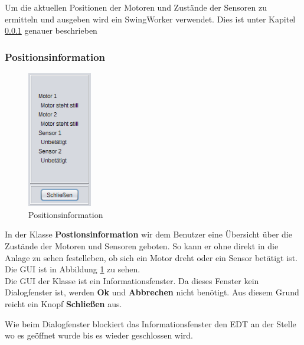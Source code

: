 \vspace{10pt}

Um die aktuellen Positionen der Motoren und Zustände der Sensoren zu ermitteln und ausgeben wird ein SwingWorker verwendet. Dies ist unter Kapitel \ref{subsubsec:Positionsinformation} genauer beschrieben

\newpage

\subsubsection{Positionsinformation} \label{subsubsec:Positionsinformation}
\begin{figure}
\vspace{-20pt}
  \begin{center}
    \includegraphics[width=0.25\textwidth]{Bilder/GUI/Positionsinformation}
  \end{center}
  \caption{Positionsinformation}
  \label{Positionsinformation}
  \vspace{-10pt}
\end{figure}
In der Klasse \textbf{Postionsinformation} wir dem Benutzer eine Übersicht über die Zustände der Motoren und Sensoren geboten. So kann er ohne direkt in die Anlage zu sehen festelleben, ob sich ein Motor dreht oder ein Sensor betätigt ist.
\\ Die GUI ist in Abbildung \ref{Positionsinformation} zu sehen.
\\ Die GUI der Klasse ist ein Informationsfenster. Da dieses Fenster kein Dialogfenster ist, werden \textbf{Ok} und \textbf{Abbrechen} nicht benötigt. Aus diesem Grund reicht ein Knopf \textbf{Schließen} aus.

\vspace{10pt}

Wie beim Dialogfenster blockiert das Informationsfenster den EDT an der Stelle wo es geöffnet wurde bis es wieder geschlossen wird.

